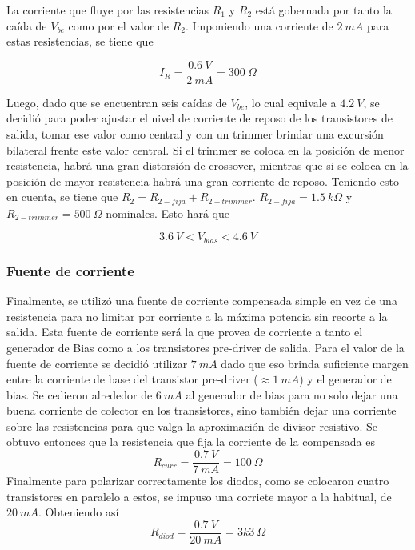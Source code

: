 La corriente que fluye por las resistencias $R_1$ y $R_2$ está gobernada por tanto la caída de $V_{be}$ como por el valor de $R_2$. Imponiendo una corriente de $2 \ mA$ para estas resistencias, se tiene que

\begin{equation}
I_R = \frac{0.6 \ V}{2 \ mA} = 300 \ \Omega
\end{equation}

Luego, dado que se encuentran seis caídas de $V_{be}$, lo cual equivale a $4.2 \ V$, se decidió para poder ajustar el nivel de corriente de reposo de los transistores de salida, tomar ese valor como central y con un trimmer brindar una excursión bilateral frente este valor central. Si el trimmer se coloca en la posición de menor resistencia, habrá una gran distorsión de crossover, mientras que si se coloca en la posición de mayor resistencia habrá una gran corriente de reposo. Teniendo esto en cuenta, se tiene que $R_2 = R_{2-fija} + R_{2-trimmer}$. $R_{2-fija} = 1.5 \ k\Omega$ y $R_{2-trimmer} = 500 \ \Omega$ nominales. Esto hará que

\begin{equation}
3.6 \ V < V_{bias} < 4.6 \ V
\end{equation} 

\subsubsection{Fuente de corriente}

Finalmente, se utilizó una fuente de corriente compensada simple en vez de una resistencia para no limitar por corriente a la máxima potencia sin recorte a la salida. Esta fuente de corriente será la que provea de corriente a tanto el generador de Bias como a los transistores pre-driver de salida. Para el valor de la fuente de corriente se decidió utilizar $7 \ mA$ dado que eso brinda suficiente margen entre la corriente de base del transistor pre-driver ($\approx 1 \ mA$) y el generador de bias. Se cedieron alrededor de $6 \ mA$ al generador de bias para no solo dejar una buena corriente de colector en los transistores, sino también dejar una corriente sobre las resistencias para que valga la aproximación de divisor resistivo. Se obtuvo entonces que la resistencia que fija la corriente de la compensada es
\begin{equation}
R_{curr} = \frac{0.7 \ V}{7 \ mA} = 100 \ \Omega
\end{equation}
Finalmente para polarizar correctamente los diodos, como se colocaron cuatro transistores en paralelo a estos, se impuso una corriete mayor a la habitual, de $20 \ mA$. Obteniendo así
\begin{equation}
R_{diod} = \frac{0.7 \ V}{20 \ mA} = 3k3 \ \Omega
\end{equation}

